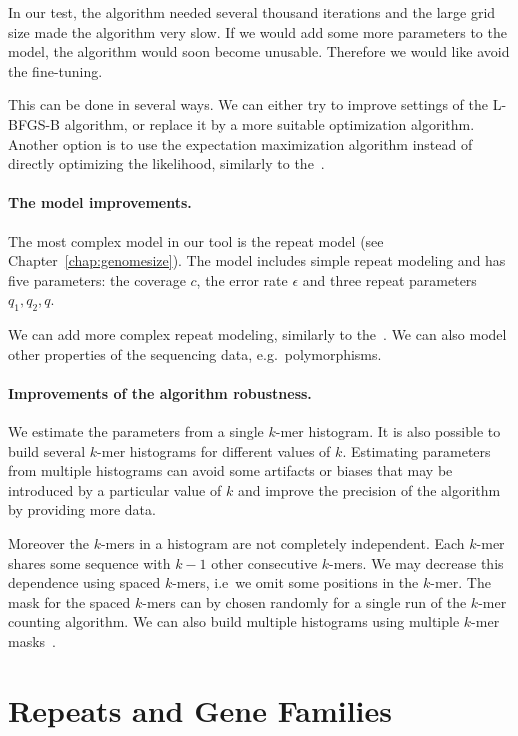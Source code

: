 In our test, the algorithm needed several thousand iterations and the large grid size made the algorithm very slow.
If we would add some more parameters to the model, the algorithm would soon become unusable. Therefore we would like avoid the fine-tuning.

This can be done in several ways. We can either try to improve settings of the L-BFGS-B algorithm, or replace it by a more suitable optimization algorithm. Another option is to use the expectation maximization algorithm instead of directly optimizing the likelihood, similarly to the~\cite{waterman}.

\paragraph{The model improvements.}
The most complex model in our tool is the repeat model (see Chapter~\ref{chap:genomesize}). The model includes simple repeat modeling and has five parameters: the coverage $c$, the error rate $\epsilon$ and three repeat parameters $q_1, q_2, q$.

We can add more complex repeat modeling, similarly to the~\cite{williams}. We can also model other properties of the sequencing data, e.g.\ polymorphisms.

\paragraph{Improvements of the algorithm robustness.}

We estimate the parameters from a single $k$-mer histogram. It is also possible to build several $k$-mer histograms for different values of $k$. Estimating parameters from multiple histograms can avoid some artifacts or biases that may be introduced by a particular value of $k$ and improve the precision of the algorithm by providing more data.

Moreover the $k$-mers in a histogram are not completely independent. Each $k$-mer shares some sequence with $k-1$ other consecutive $k$-mers. We may decrease this dependence using spaced $k$-mers, i.e\ we omit some positions in the $k$-mer.
The mask for the spaced $k$-mers can by chosen randomly for a single run of the $k$-mer counting algorithm. We can also build multiple histograms using multiple $k$-mer masks~\cite{keich2004spaced}.

\section{Repeats and Gene Families}\label{sect:repeats-families}

